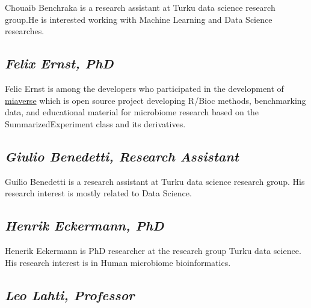 \documentclass[
]{book}
\begin{document}
Chouaib Benchraka is a research assistant at Turku data science research group.He is interested working with Machine Learning and Data Science researches.

\hypertarget{felix-ernst-phd}{%
\subsection*{\texorpdfstring{\emph{Felix Ernst, PhD}}{Felix Ernst, PhD}}\label{felix-ernst-phd}}

Felic Ernst is among the developers who participated in the development of \href{https://microbiome.github.io}{miaverse} which is open source project developing R/Bioc methods, benchmarking data, and educational material for microbiome research based on the SummarizedExperiment class and its derivatives.

\hypertarget{giulio-benedetti-research-assistant}{%
\subsection*{\texorpdfstring{\emph{Giulio Benedetti, Research Assistant}}{Giulio Benedetti, Research Assistant}}\label{giulio-benedetti-research-assistant}}

Guilio Benedetti is a research assistant at Turku data science research group. His research interest is mostly related to Data Science.

\hypertarget{henrik-eckermann-phd}{%
\subsection*{\texorpdfstring{\emph{Henrik Eckermann, PhD}}{Henrik Eckermann, PhD}}\label{henrik-eckermann-phd}}

Henerik Eckermann is PhD researcher at the research group Turku data science. His research interest is in Human microbiome bioinformatics.

\hypertarget{leo-lahti-professor}{%
\subsection*{\texorpdfstring{\emph{Leo Lahti, Professor}}{Leo Lahti, Professor}}\label{leo-lahti-professor}}
\end{document}
